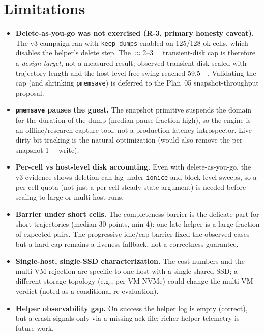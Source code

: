 \documentclass[conference]{IEEEtran}
\begin{document}
\section{Limitations}
\begin{itemize}
  \item \textbf{Delete-as-you-go was not exercised (R-3, primary honesty
        caveat).} The v3 campaign ran with \texttt{keep\_dumps} enabled on
        125/128 ok cells, which disables the helper's delete step. The
        $\approx$\SI{2}{}--\SI{3}{\gibi\byte} transient-disk cap is therefore a
        \emph{design target}, not a measured result; observed transient disk
        scaled with trajectory length and the host-level free swing reached
        \SI{59.5}{\gibi\byte}. Validating the cap (and shrinking
        \texttt{pmemsave}) is deferred to the Plan~05 snapshot-throughput
        proposal.
  \item \textbf{\texttt{pmemsave} pauses the guest.} The snapshot primitive
        suspends the domain for the duration of the dump (median pause fraction
        high), so the engine is an offline/research capture tool, not a
        production-latency introspector. Live dirty-bit tracking is the natural
        optimization (would also remove the per-snapshot \SI{1}{\gibi\byte}
        write).
  \item \textbf{Per-cell vs host-level disk accounting.} Even with
        delete-as-you-go, the v3 evidence shows deletion can lag under
        \texttt{ionice} and block-level sweeps, so a per-cell quota (not just a
        per-cell steady-state argument) is needed before scaling to large or
        multi-host runs.
  \item \textbf{Barrier under short cells.} The completeness barrier is the
        delicate part for short trajectories (median 30 points, min 4): one
        late helper is a large fraction of expected pairs. The progressive
        idle/cap barrier fixed the observed cases but a hard cap remains a
        liveness fallback, not a correctness guarantee.
  \item \textbf{Single-host, single-SSD characterization.} The cost numbers and
        the multi-VM rejection are specific to one host with a single shared
        SSD; a different storage topology (e.g., per-VM NVMe) could change the
        multi-VM verdict (noted as a conditional re-evaluation).
  \item \textbf{Helper observability gap.} On success the helper log is empty
        (correct), but a crash signals only via a missing ack file; richer
        helper telemetry is future work.
\end{itemize}
\end{document}
